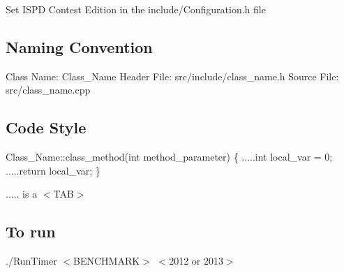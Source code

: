 Set I\-S\-P\-D Contest Edition in the include/\-Configuration.\-h file

\subsection*{Naming Convention }

Class Name\-: Class\-\_\-\-Name Header File\-: src/include/class\-\_\-name.\-h Source File\-: src/class\-\_\-name.\-cpp

\subsection*{Code Style }

Class\-\_\-\-Name\-::class\-\_\-method(int method\-\_\-parameter) \{ .....int local\-\_\-var = 0; .....return local\-\_\-var; \}

..... is a $<$T\-A\-B$>$

\subsection*{To run }

./\-Run\-Timer $<$B\-E\-N\-C\-H\-M\-A\-R\-K$>$ $<$2012 or 2013$>$ 